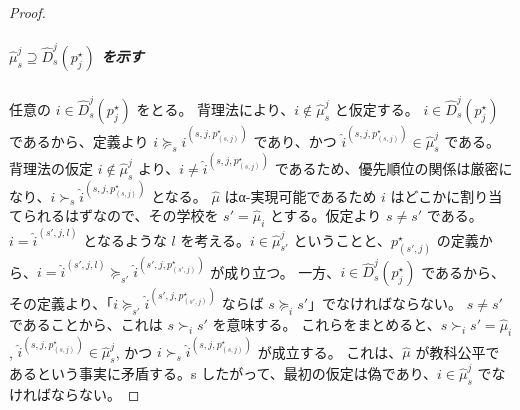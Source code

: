 \documentclass[12pt, a4paper]{article}
\theoremstyle{definition}
\theoremstyle{remark}
\theoremstyle{plain}
\begin{document}
\begin{proof}


\subparagraph{\(\widehat{\mu}_s^j \supseteq \widehat{D}_s^j(p_j^\star)\) を示す}
任意の \(i \in \widehat{D}_s^j(p_j^\star)\) をとる。
背理法により、$i \notin \widehat{\mu}_s^j$ と仮定する。
\(i \in \widehat{D}_s^j(p_j^\star)\) であるから、定義より \(i \succeq_s \widehat{i}^{(s,j,p_{(s,j)}^\star)}\) であり、かつ $\widehat{i}^{(s,j,p_{(s,j)}^\star)} \in \widehat{\mu}_s^j$ である。
背理法の仮定 \(i \notin \widehat{\mu}_s^j\) より、$i \neq \widehat{i}^{(s,j,p_{(s,j)}^\star)}$ であるため、優先順位の関係は厳密になり、$i \succ_s \widehat{i}^{(s,j,p_{(s,j)}^\star)}$ となる。
$\widehat{\mu}$ はα-実現可能であるため \(i\) はどこかに割り当てられるはずなので、その学校を $s' = \widehat{\mu}_i$ とする。仮定より $s \neq s'$ である。
$i = \widehat{i}^{(s',j,l)}$ となるような $l$ を考える。$i \in \widehat{\mu}_{s'}^j$ ということと、$p_{(s',j)}^\star$ の定義から、$i = \widehat{i}^{(s',j, l)} \succeq_{s'} \widehat{i}^{(s',j,p_{(s',j)}^\star)}$ が成り立つ。
一方、$i \in \widehat{D}_s^j(p_j^\star)$ であるから、その定義より、「$i \succeq_{s'} \widehat{i}^{(s',j,p_{(s',j)}^\star)}$ ならば $s \succeq_i s'$」でなければならない。
$s \neq s'$ であることから、これは $s \succ_i s'$ を意味する。
これらをまとめると、$s \succ_i s' = \widehat{\mu}_i$, $\widehat{i}^{(s,j,p_{(s,j)}^\star)} \in \widehat{\mu}_s^j$, かつ $i \succ_s \widehat{i}^{(s,j,p_{(s,j)}^\star)}$ が成立する。
これは、$\widehat{\mu}$ が教科公平であるという事実に矛盾する。s
したがって、最初の仮定は偽であり、$i \in \widehat{\mu}_s^j$ でなければならない。



\end{proof}
\end{document}
